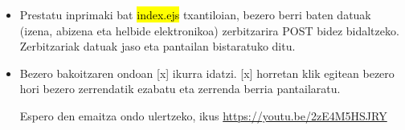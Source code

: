 \begin{itemize}
    \item Prestatu inprimaki bat \hl{index.ejs} txantiloian, bezero berri baten datuak (izena, abizena eta helbide elektronikoa) zerbitzarira POST bidez bidaltzeko. Zerbitzariak datuak jaso eta pantailan bistaratuko ditu. 
    \item Bezero bakoitzaren ondoan [x] ikurra idatzi. [x] horretan klik egitean bezero hori bezero zerrendatik ezabatu eta zerrenda berria pantailaratu.

    Espero den emaitza ondo ulertzeko, ikus \href{https://youtu.be/2zE4M5HSJRY}{https://youtu.be/2zE4M5HSJRY}
\end{itemize}



